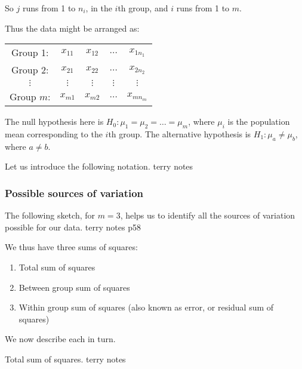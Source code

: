 \documentclass[12pt]{article}
\theoremstyle{break}
\begin{document}
So $j$ runs from 1 to $n_i$, in the $i$th group, and $i$ runs from 1 to $m$.

Thus the data might be arranged as:
\begin{center}
\begin{tabular}{ccccc}
  Group 1: & $x_{11}$ & $x_{12}$ & $\ldots$ & $x_{1n_{1}}$ \\
  Group 2: & $x_{21}$ & $x_{22}$ & $\ldots$ & $x_{2n_{2}}$ \\
  $\vdots$ & $\vdots$ & $\vdots$ & $\vdots$ & $\vdots$ \\
  Group $m$: & $x_{m1}$ & $x_{m2}$ & $\ldots$ & $x_{mn_{m}}$ \\
\end{tabular}
\end{center}
The null hypothesis here is $H_{0}: \mu_{1}=\mu_{2}=\ldots=\mu_{m}$, where $\mu_{i}$ is the population mean corresponding to the $i$th group. The alternative hypothesis is $H_{1}:\mu_{a}\neq\mu_{b}$, where $a\neq b$.

\begin{mdframed}
Let us introduce the following notation.
\textcolor[rgb]{1.00,1.00,1.00}{terry notes\lipsum[1-8]}
\end{mdframed}

\subsubsection{Possible sources of variation}

\begin{mdframed}
The following sketch, for $m=3$, helps us to identify all the sources of variation possible for our data.
\textcolor[rgb]{1.00,1.00,1.00}{terry notes p58\lipsum[1-4]}
\end{mdframed}

We thus have three sums of squares:
\begin{enumerate}
\item Total sum of squares
\item Between group sum of squares
\item Within group sum of squares (also known as error, or residual sum of squares)
\end{enumerate}
We now describe each in turn.

\begin{mdframed}
Total sum of squares.
\textcolor[rgb]{1.00,1.00,1.00}{terry notes\lipsum[1-6]}
\end{mdframed}
\end{document}
